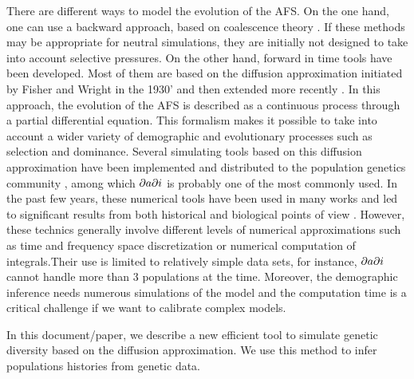 There are different ways to model the evolution of the AFS. On the one hand, one can use a backward approach, based on coalescence theory \cite{excoffier2011, kamm2015}. If these methods may be appropriate for neutral simulations, they are initially not designed to take into account selective pressures. On the other hand, forward in time tools have been developed. Most of them are based on the diffusion approximation initiated by Fisher and Wright in the 1930' \cite{fisher1930, wright1931} and then extended more recently \cite{crow1970, kimura1964}. In this approach, the evolution of the AFS is described as a continuous process through a partial differential equation. This formalism makes it possible to take into account a wider variety of demographic and evolutionary processes such as selection and dominance. Several simulating tools based on this diffusion approximation have been implemented and distributed to the population genetics community \cite{gutenkunst2009, lukic2012, lukic2011}, among which $\partial a \partial i$ is probably one of the most commonly used. In the past few years, these numerical tools have been used in many works and led to significant results from both historical and biological points of view \cite{gutenkunst2009, gravel2011, schmutz2014}. However, these technics generally involve different levels of numerical approximations such as time and frequency space discretization or numerical computation of integrals.Their use is limited to relatively simple data sets, for instance, $\partial a \partial i$ cannot handle more than 3 populations at the time. Moreover, the demographic inference needs numerous simulations of the model and the computation time is a critical challenge if we want to calibrate complex models.

In this document/paper, we describe a new efficient tool to simulate genetic diversity based on the diffusion approximation. We use this method to infer populations histories from genetic data.
